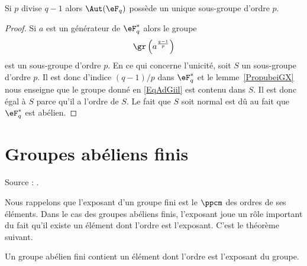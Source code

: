 \begin{corollary}       \label{CorwgmoTK}
	Si \( p\) divise \( q-1\) alors \( \Aut(\eF_q)\) possède un unique sous-groupe d'ordre \( p\).
\end{corollary}

\begin{proof}
	Si \( a\) est un générateur de \( \eF_q^*\) alors le groupe
	\begin{equation}    \label{EqAdGiil}
		\gr\left( a^{\frac{ q-1 }{ p }} \right)
	\end{equation}
	est un sous-groupe d'ordre \( p\). En ce qui concerne l'unicité, soit \( S\) un sous-groupe d'ordre \( p\). Il est donc d'indice \( (q-1)/p\) dans \( \eF_q^*\) et le lemme~\ref{PropubeiGX} nous enseigne que le groupe donné en \eqref{EqAdGiil} est contenu dans \( S\). Il est donc égal à \( S\) parce qu'il a l'ordre de \( S\). Le fait que \( S\) soit normal est dû au fait que \( \eF_q^*\) est abélien.
\end{proof}




\section{Groupes abéliens finis}

Source : \cite{FabricegPSFinis}.

Nous rappelons que l'exposant d'un groupe fini est le \( \ppcm\) des ordres de ses éléments. Dans le cas des groupes abéliens finis, l'exposant joue un rôle important du fait qu'il existe un élément dont l'ordre est l'exposant. C'est le théorème suivant.

\begin{theorem}
	Un groupe abélien fini contient un élément dont l'ordre est l'exposant du groupe.
\end{theorem}

